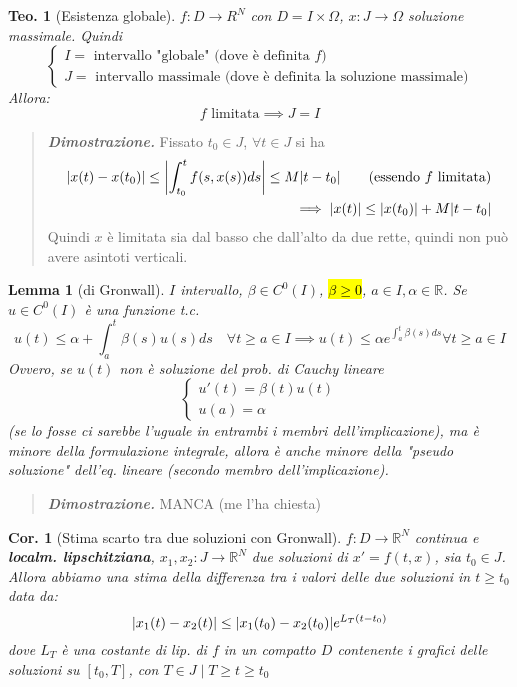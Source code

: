 \documentclass[a4paper,10pt]{article}
\newcommand{\re}{\mathbb{R}} %
\theoremstyle{indentdefinition}
\theoremstyle{indenttheorem}
\newtheorem{thm}{Teo.}
\newtheorem{lem}{Lemma}
\newtheorem{cor}{Cor.}
\theoremstyle{myremark}
\theoremstyle{indentgeneral}
\newenvironment{dimo}{\begin{quote}\textit{\textbf{Dimostrazione.}}}{\end{quote}} %
\begin{document}
\begin{thm}[Esistenza globale]
    $f:D\to R^N$ con $D=I\times\Omega$, $x:J\to\Omega$ soluzione massimale. Quindi
    $$\begin{cases}
        I = \text{ intervallo "globale" (dove è definita $f$)} \\
        J = \text{ intervallo massimale (dove è definita la soluzione massimale)}
    \end{cases}$$
    Allora: 
    $$f \text{ limitata} \implies J=I$$
\end{thm}

\begin{dimo}
    Fissato $t_0\in J$, $\forall t\in J$ si  ha 
    \begin{align*}
        \abs{x(t)-x(t_0)}\le\abs{\int_{t_0}^tf(s,x(s))ds}\le M\abs{t-t_0} \quad \quad \text{(essendo $f$ limitata)}\\
        \implies \abs{x(t)}\le\abs{x(t_0)}+ M\abs{t-t_0}
    \end{align*}
    Quindi $x$ è limitata sia dal basso che dall'alto da due rette, quindi non può avere asintoti verticali.
\end{dimo}

\begin{lem}[di Gronwall]
    $I$ intervallo, $\beta\in C^0(I)$, \hl{$\beta\ge0$}, $a\in I,\alpha\in\re$. Se $u\in C^0(I)$ è una funzione t.c.
    $$u(t)\le\alpha+\int_a^t\beta(s)u(s)ds \quad \forall t\ge a\in I \implies u(t)\le\alpha e^{\int_a^t\beta(s)ds } \forall t\ge a\in I$$
    Ovvero, se $u(t)$ non è soluzione del prob. di Cauchy lineare
    $$\begin{cases}
        u'(t)=\beta(t)u(t) \\
        u(a)=\alpha
    \end{cases}$$
    (se lo fosse ci sarebbe l'uguale in entrambi i membri dell'implicazione), ma è minore della formulazione integrale, allora è anche minore della "pseudo soluzione" dell'eq. lineare (secondo membro dell'implicazione).
\end{lem}

\begin{dimo}
    MANCA (me l'ha chiesta)
\end{dimo}

\begin{cor}[Stima scarto tra due soluzioni con Gronwall]
    $f:D\to\re^N$ continua e \textbf{localm. lipschitziana}, $x_1,x_2:J\to\re^N$ due soluzioni di $x'=f(t,x)$, sia $t_0\in J$. Allora abbiamo una stima della differenza tra i valori delle due soluzioni in $t\ge t_0$ data da:
    $$\abs{x_1(t)-x_2(t)}\le \abs{x_1(t_0)-x_2(t_0)}e^{L_T(t-t_0)}$$
    dove $L_T$ è una costante di lip. di $f$ in un compatto $D$ contenente i grafici delle soluzioni su $[t_0, T]$, con $T\in J\mid T\ge t\ge t_0$
\end{cor}
\end{document}
